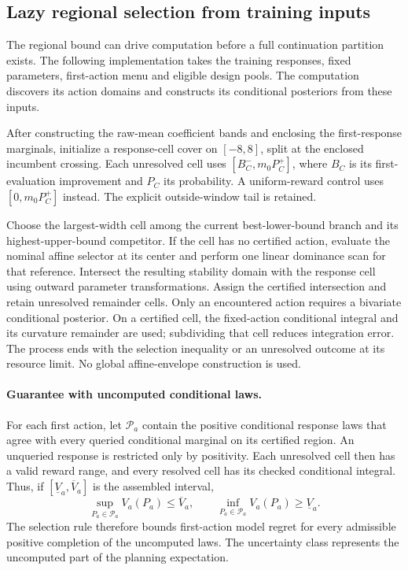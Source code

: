 \subsection{Lazy regional selection from training inputs}\label{sec:lazy_regional}

The regional bound can drive computation before a full continuation partition exists. The following implementation takes the training responses, fixed parameters, first-action menu and eligible design pools. The computation discovers its action domains and constructs its conditional posteriors from these inputs.

After constructing the raw-mean coefficient bands and enclosing the first-response marginals, initialize a response-cell cover on $[-8,8]$, split at the enclosed incumbent crossing. Each unresolved cell uses $[B_C^-,m_0 P_C^+]$, where $B_C$ is its first-evaluation improvement and $P_C$ its probability. A uniform-reward control uses $[0,m_0P_C^+]$ instead. The explicit outside-window tail is retained.

Choose the largest-width cell among the current best-lower-bound branch and its highest-upper-bound competitor. If the cell has no certified action, evaluate the nominal affine selector at its center and perform one linear dominance scan for that reference. Intersect the resulting stability domain with the response cell using outward parameter transformations. Assign the certified intersection and retain unresolved remainder cells. Only an encountered action requires a bivariate conditional posterior. On a certified cell, the fixed-action conditional integral and its curvature remainder are used; subdividing that cell reduces integration error. The process ends with the selection inequality or an unresolved outcome at its resource limit. No global affine-envelope construction is used.

\paragraph{Guarantee with uncomputed conditional laws.}
For each first action, let $\mathcal P_a$ contain the positive conditional response laws that agree with every queried conditional marginal on its certified region. An unqueried response is restricted only by positivity. Each unresolved cell then has a valid reward range, and every resolved cell has its checked conditional integral. Thus, if $[\underline V_a,\overline V_a]$ is the assembled interval,
\begin{equation}
\sup_{P_a\in\mathcal P_a}V_a(P_a)\le\overline V_a,
\qquad
\inf_{P_a\in\mathcal P_a}V_a(P_a)\ge\underline V_a.
\label{eq:lazy_completion}
\end{equation}
The selection rule therefore bounds first-action model regret for every admissible positive completion of the uncomputed laws. The uncertainty class represents the uncomputed part of the planning expectation.

